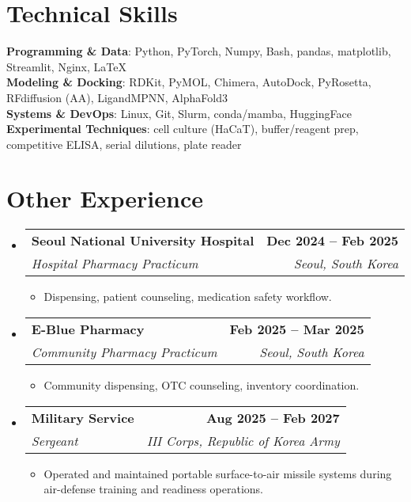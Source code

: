 \documentclass[letterpaper,11pt]{article}
\makeatletter
\newcommand{\resumeItem}[1]{
  \item\small{
    {#1 \vspace{-2pt}}
  }
}
\newcommand{\resumeSubheading}[4]{
  \vspace{-2pt}\item
    \begin{tabular*}{1.0\textwidth}[t]{l@{\extracolsep{\fill}}r}
      \textbf{#1} & \textbf{\small #2} \\
      \textit{\small#3} & \textit{\small #4} \\
    \end{tabular*}\vspace{-7pt}
}
\newcommand{\resumeSubHeadingListStart}{\begin{itemize}[leftmargin=0.0in, label={}]}
\newcommand{\resumeSubHeadingListEnd}{\end{itemize}}
\newcommand{\resumeItemListStart}{\begin{itemize}[leftmargin=0.2in]}
\newcommand{\resumeItemListEnd}{\end{itemize}\vspace{-5pt}}
\makeatother
\begin{document}
\section{Technical Skills}
 \begin{itemize}[leftmargin=0.15in, label={}]
    \small{\item{
    \textbf{Programming \& Data}: Python, PyTorch, Numpy, Bash, pandas, matplotlib, Streamlit, Nginx, LaTeX \\
    \textbf{Modeling \& Docking}: RDKit, PyMOL, Chimera, AutoDock, PyRosetta, RFdiffusion (AA), LigandMPNN, AlphaFold3 \\
    \textbf{Systems \& DevOps}: Linux, Git, Slurm, conda/mamba, HuggingFace \\
    \textbf{Experimental Techniques}: cell culture (HaCaT), buffer/reagent prep, competitive ELISA, serial dilutions, plate reader

    }}
 \end{itemize}
 \vspace{-16pt}


\section{Other Experience}
  \resumeSubHeadingListStart
    \resumeSubheading
      {Seoul National University Hospital}{Dec 2024 -- Feb 2025}
      {Hospital Pharmacy Practicum}{Seoul, South Korea}
      \resumeItemListStart
        \resumeItem{Dispensing, patient counseling, medication safety workflow.}
      \resumeItemListEnd
    \resumeSubheading
      {E-Blue Pharmacy}{Feb 2025 -- Mar 2025}
      {Community Pharmacy Practicum}{Seoul, South Korea}
      \resumeItemListStart
        \resumeItem{Community dispensing, OTC counseling, inventory coordination.}
      \resumeItemListEnd
    \resumeSubheading
      {Military Service}{Aug 2025 -- Feb 2027}
      {Sergeant}{III Corps, Republic of Korea Army}
      \resumeItemListStart
        \resumeItem{Operated and maintained portable surface-to-air missile systems during air-defense training and readiness operations.}
      \resumeItemListEnd
  \resumeSubHeadingListEnd
\end{document}
